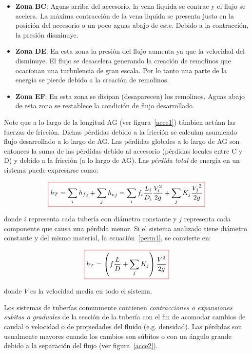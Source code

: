 \documentclass[11pt, oneside]{article}
\begin{document}
\begin{itemize}
\item \textbf{Zona BC}: Aguas arriba del accesorio, la vena l\'iquida se contrae y el flujo se acelera. La m\'axima contracci\'on de la vena liquida se presenta justo en la posici\'on del accesorio o un poco aguas abajo de este. Debido a la contracci\'on, la presi\'on disminuye. 
\item \textbf{Zona DE}: En esta zona la presi\'on del flujo aumenta ya que la velocidad del  disminuye. El flujo se desacelera generando la creaci\'on de remolinos que ocacionan una turbulencia de gran escala. Por lo tanto una parte de la energ\'ia se pierde debido a la creaci\'on de remolinos. 
\item \textbf{Zona EF}: En esta zona se disipan (desaparecen) los remolinos. Aguas abajo de esta zona se restablece la condici\'on de flujo desarrollado.
\end{itemize}

Note que a lo largo de la longitud AG (ver figura~\ref{acce1}) t\'ambien act\'uan las fuerzas de fricci\'on. Dichas p\'erdidas debido a la fricci\'on se calculan asumiendo flujo desarrollado a lo largo de AG. Las p\'erdidas globales a lo largo de AG son entonces la suma de las p\'erdidas debido al accesorio (p\'erdidas locales entre C y D) y debido a la fricci\'on (a lo largo de AG). Las \emph{p\'erdida total} de energ\'ia en un sistema puede expresarse como:
  
\begin{equation}
\color{red}\boxed{\color{black} h_T = \sum_{i} {h_f}_i + \sum_{j} {h_e}_j =\sum_{i} f_i \frac{L_i }{D_i} \frac{V_i^2}{2g} + \sum_{j} K_j \frac{{V_j}^2}{2g} }
\label{perm1}
\end{equation}

donde $i$ representa cada tuber\'ia con di\'ametro constante y $j$ representa cada componente que causa una p\'erdida menor. Si el sistema analizado tiene di\'ametro constante y del mismo material, la ecuaci\'on~\ref{perm1}, se convierte en:

\begin{equation}
\color{red}\boxed{\color{black} h_T = \left( f \frac{L }{D} + \sum_{j} K_j \right) \frac{V^2}{2g} }
\label{perm2}
\end{equation}

donde $V$ es la velocidad media en todo el sistema. 

Los sistemas de tuber\'ias comunmente contienen \emph{contracciones o expansiones subitas o graduales} de la secci\'on de la tuber\'ia con el fin de acomodar cambios de caudal o velocidad o de propiedades del fluido (e.g. densidad). Las p\'erdidas son usualmente mayores cuando los cambios son s\'ubitos o con un \'angulo grande debido a la separaci\'on del flujo (ver figura~\ref{acce2}).
\end{document}
